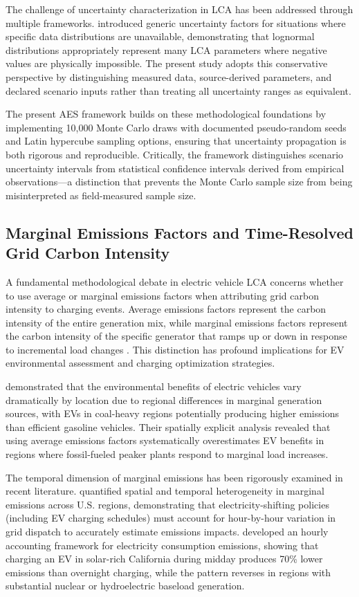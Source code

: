 \documentclass[cleantechnol,article,submit,pdftex,moreauthors]{Definitions/mdpi}
\begin{document}
The challenge of uncertainty characterization in LCA has been addressed through multiple frameworks. \citet{Geisler2005} introduced generic uncertainty factors for situations where specific data distributions are unavailable, demonstrating that lognormal distributions appropriately represent many LCA parameters where negative values are physically impossible. The present study adopts this conservative perspective by distinguishing measured data, source-derived parameters, and declared scenario inputs rather than treating all uncertainty ranges as equivalent.

The present AES framework builds on these methodological foundations by implementing 10,000 Monte Carlo draws with documented pseudo-random seeds and Latin hypercube sampling options, ensuring that uncertainty propagation is both rigorous and reproducible. Critically, the framework distinguishes scenario uncertainty intervals from statistical confidence intervals derived from empirical observations—a distinction that prevents the Monte Carlo sample size from being misinterpreted as field-measured sample size.

\subsection{Marginal Emissions Factors and Time-Resolved Grid Carbon Intensity}

A fundamental methodological debate in electric vehicle LCA concerns whether to use average or marginal emissions factors when attributing grid carbon intensity to charging events. Average emissions factors represent the carbon intensity of the entire generation mix, while marginal emissions factors represent the carbon intensity of the specific generator that ramps up or down in response to incremental load changes \citep{Hawkes2014}. This distinction has profound implications for EV environmental assessment and charging optimization strategies.

\citet{Holland2016} demonstrated that the environmental benefits of electric vehicles vary dramatically by location due to regional differences in marginal generation sources, with EVs in coal-heavy regions potentially producing higher emissions than efficient gasoline vehicles. Their spatially explicit analysis revealed that using average emissions factors systematically overestimates EV benefits in regions where fossil-fueled peaker plants respond to marginal load increases.

The temporal dimension of marginal emissions has been rigorously examined in recent literature. \citet{GraffZivin2014} quantified spatial and temporal heterogeneity in marginal emissions across U.S. regions, demonstrating that electricity-shifting policies (including EV charging schedules) must account for hour-by-hour variation in grid dispatch to accurately estimate emissions impacts. \citet{Miller2021} developed an hourly accounting framework for electricity consumption emissions, showing that charging an EV in solar-rich California during midday produces 70\% lower emissions than overnight charging, while the pattern reverses in regions with substantial nuclear or hydroelectric baseload generation.
\end{document}
